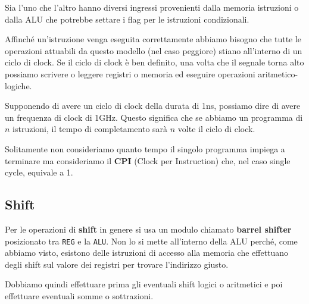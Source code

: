 Sia l'uno che l'altro hanno diversi ingressi provenienti dalla memoria istruzioni o dalla ALU che
potrebbe settare i flag per le istruzioni condizionali.

Affinché un'istruzione venga eseguita correttamente abbiamo bisogno che tutte le operazioni
attuabili da questo modello (nel caso peggiore) stiano all'interno di un ciclo di clock. Se il
ciclo di clock è ben definito, una volta che il segnale torna alto possiamo scrivere o leggere
registri o memoria ed eseguire operazioni aritmetico-logiche.

Supponendo di avere un ciclo di clock della durata di 1ns, possiamo dire di avere un frequenza di
clock di 1GHz. Questo significa che se abbiamo un programma di $n$ istruzioni, il tempo di
completamento sarà $n$ volte il ciclo di clock.

Solitamente non consideriamo quanto tempo il singolo programma impiega a terminare ma consideriamo
il \textbf{CPI} (Clock per Instruction) che, nel caso single cycle, equivale a 1.

\subsection{Shift}
Per le operazioni di \textbf{shift} in genere si usa un modulo chiamato \textbf{barrel shifter}
posizionato tra \verb|REG| e la \verb|ALU|. Non lo si mette all'interno della ALU perché, come
abbiamo visto, esistono delle istruzioni di accesso alla memoria che effettuano degli shift sul
valore dei registri per trovare l'indirizzo giusto.

Dobbiamo quindi effettuare prima gli eventuali shift logici o aritmetici e poi effettuare eventuali
somme o sottrazioni.